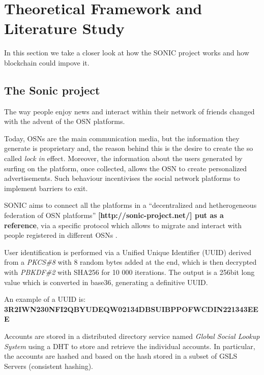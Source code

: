 \section{Theoretical Framework and Literature Study}
\label{S:2}

In this section we take a closer look at how the SONIC project works and how blockchain could impove it. 

\subsection{The Sonic project}

The way people enjoy news and interact within their network of friends changed with the advent of the OSN platforms. \par
Today, OSNs are the main communication media, but the information they generate is proprietary and, the reason behind this is the desire to create the so called \textit{lock in} effect.
Moreover, the information about the users generated by surfing on the platform, once collected, allows the OSN to create personalized advertisements. Such behaviour incentivises the social network platforms to implement barriers to exit. \par
SONIC aims to connect all the platforms in a ``decentralized and hetherogeneous federation of OSN platforms'' \textbf{[http://sonic-project.net/] put as a reference}, via a specific protocol which allows to migrate and interact with people registered in different OSNs \cite{gondor_sonic:_2014}. \par
User identification is performed via a Unified Unique Identifier (UUID) derived from a \textit{PKCS\#8} \cite{pkcs8}with 8 random bytes added at the end, which is then decrypted with \textit{PBKDF\#2} \cite{pkcs8} with SHA256 \cite{hansen_us} for 10 000 iterations.
The output is a 256bit long value which is converted in base36, generating a definitive UUID. \par

An example of a UUID is: \\ \textbf{3R2IWN230NFI2QBYUDEQW02134DBSUIBPPOFWCDIN221343EEE}\cite{gondor_sonic:_2014} \par

Accounts are stored in a distributed directory service named \textit{Global Social Lookup System} using a DHT to store and retrieve the individual accounts. In particular, the accounts are hashed and based on the hash stored in a subset of GSLS Servers (consistent hashing). \par

